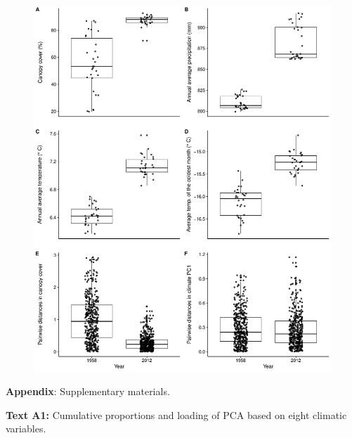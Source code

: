 \begin{figure}
\begin{centering}
\includegraphics[width=1\textwidth]{chapter2/figures-maintext/shade_climate.pdf}
\par\end{centering}
\caption{\label{fig:shade_climate_changes}
}
\end{figure}

\clearpage{}

\appendix  %

\renewcommand{\tablename}{\textsc{Table}}
\renewcommand {\thetable}{\textbf{A\arabic{table}}}
\renewcommand{\figurename}{\textsc{Fig.}}
\renewcommand {\thefigure}{\textbf{A\arabic{figure}}}
\setcounter{figure}{0}
\setcounter{table}{0}
\textbf{\LARGE{}Appendix}{\LARGE{}: Supplementary materials.}{\LARGE \par}

\bigskip{}


\textbf{Text A1:} Cumulative proportions and loading of PCA based
on eight climatic variables.\\


